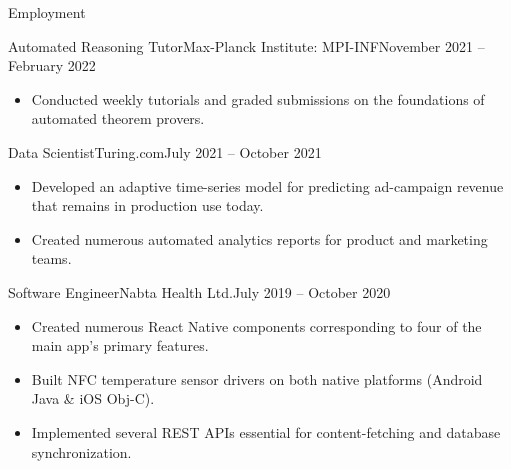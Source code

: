 \documentclass[]{mcdowellcv}
\begin{document}
\begin{cvsection}{Employment}
		\begin{cvsubsection}{Automated Reasoning Tutor}{Max-Planck Institute: MPI-INF}{November 2021 -- February 2022}		
			\begin{itemize}
				\item Conducted weekly tutorials and graded submissions  on the foundations of automated theorem provers.
			\end{itemize}
		\end{cvsubsection}
		
		\begin{cvsubsection}{Data Scientist}{Turing.com}{July 2021 -- October 2021}
			\begin{itemize}
				\item Developed an adaptive time-series model for predicting ad-campaign revenue that remains in production use today.
				\item Created numerous automated analytics reports for product and marketing teams.
			\end{itemize}
		\end{cvsubsection}

            \begin{cvsubsection}{Software Engineer}{Nabta Health Ltd.}{July 2019 -- October 2020}
			\begin{itemize}
				\item Created numerous React Native components corresponding to four of the main app's primary features.
                    \item Built NFC temperature sensor drivers on both native platforms (Android Java \& iOS Obj-C).
                    \item Implemented several REST APIs essential for content-fetching and database synchronization.
			\end{itemize}
		\end{cvsubsection}
	\end{cvsection}
	
\end{document}
